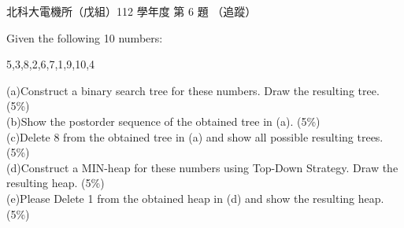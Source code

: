 \begin{pastexam}[label={px:ntut-112-ee-ds-06}]{北科大電機所（戊組）112 學年度 第 6 題}
（追蹤）

Given the following 10 numbers:
\begin{center}5,3,8,2,6,7,1,9,10,4\end{center}
(a)Construct a binary search tree for these numbers. Draw the resulting tree. (5\%)\\
(b)Show the postorder sequence of the obtained tree in (a). (5\%)\\
(c)Delete 8 from the obtained tree in (a) and show all possible resulting trees. (5\%)\\
(d)Construct a MIN-heap for these numbers using Top-Down Strategy. Draw the resulting heap. (5\%)\\
(e)Please Delete 1 from the obtained heap in (d) and show the resulting heap. (5\%)
\end{pastexam}


